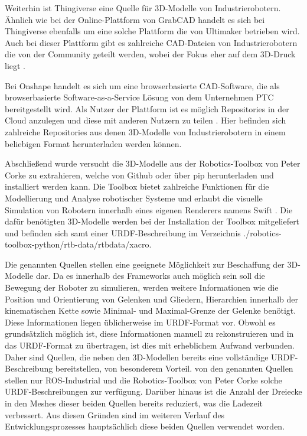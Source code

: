 Weiterhin ist Thingiverse eine Quelle für 3D-Modelle von Industrierobotern.
Ähnlich wie bei der Online-Plattform von GrabCAD handelt es sich bei Thingiverse
ebenfalls um eine solche Plattform die von Ultimaker betrieben wird.
Auch bei dieser Plattform gibt es zahlreiche CAD-Dateien von Industrierobotern
die von der Community geteilt werden, wobei der Fokus eher auf dem 3D-Druck liegt .


Bei Onshape handelt es sich um eine browserbasierte CAD-Software,
die als browserbasierte Software-as-a-Service Lösung von dem Unternehmen PTC bereitgestellt wird.
Als Nutzer der Plattform ist es möglich Repositories in der Cloud anzulegen und diese mit anderen Nutzern zu teilen .
Hier befinden sich zahlreiche Repositories aus denen 3D-Modelle von Industrierobotern in einem beliebigen Format herunterladen werden können.


Abschließend wurde versucht die 3D-Modelle aus der Robotics-Toolbox von Peter Corke zu extrahieren,
welche von Github oder über pip herunterladen und installiert werden kann.
Die Toolbox bietet zahlreiche Funktionen für die Modellierung und Analyse robotischer Systeme und erlaubt
die visuelle Simulation von Robotern innerhalb eines eigenen Renderers namens Swift .
Die dafür benötigten 3D-Modelle werden bei der Installation der Toolbox mitgeliefert und befinden sich samt einer URDF-Beschreibung
im Verzeichnis ./robotics-toolbox-python/rtb-data/rtbdata/xacro.

Die genannten Quellen stellen eine geeignete Möglichkeit zur Beschaffung der 3D-Modelle dar.
Da es innerhalb des Frameworks auch möglich sein soll die Bewegung der Roboter zu simulieren,
werden weitere Informationen wie die Position und Orientierung von Gelenken und Gliedern,
Hierarchien innerhalb der kinematischen Kette sowie Minimal- und Maximal-Grenze der Gelenke benötigt.
Diese Informationen liegen üblicherweise im URDF-Format vor.
Obwohl es grundsätzlich möglich ist, diese Informationen manuell zu rekonstruieren und in das URDF-Format zu übertragen,
ist dies mit erheblichem Aufwand verbunden.
Daher sind Quellen, die neben den 3D-Modellen bereits eine vollständige URDF-Beschreibung bereitstellen, von besonderem Vorteil.
von den genannten Quellen stellen nur ROS-Industrial und die Robotics-Toolbox von Peter Corke solche URDF-Beschreibungen zur verfügung.
Darüber hinaus ist die Anzahl der Dreiecke in den Meshes dieser beiden Quellen bereits reduziert, was die Ladezeit verbessert.
Aus diesen Gründen sind im weiteren Verlauf des Entwicklungsprozesses hauptsächlich diese beiden Quellen verwendet worden.



